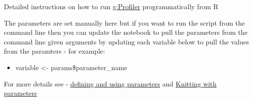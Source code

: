 \documentclass[
]{book}
\providecommand{\tightlist}{%
  \setlength{\itemsep}{0pt}\setlength{\parskip}{0pt}}
\begin{document}
Detailed instructions on how to run \href{https://biit.cs.ut.ee/gprofiler/gost}{g:Profiler} programmatically from R

The parameters are set manually here but if you want to run the script from the command line then you can update the notebook to pull the parameters from the command line given arguments by updating each variable below to pull the values from the paramters - for example:

\begin{itemize}
\tightlist
\item
  variable \textless- params\$parameter\_name
\end{itemize}

For more details see - \href{https://bookdown.org/yihui/rmarkdown/params-declare.html}{defining and using parameters} and \href{https://bookdown.org/yihui/rmarkdown/params-knit.html}{Knitting with parameters}
\end{document}
